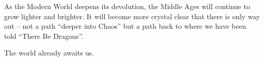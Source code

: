 As the Modern World deepens its devolution, the Middle Ages will continue to grow lighter and brighter. It will become more crystal clear that there is only way out -- not a path ``deeper into Chaos'' but a path back to where we have been told ``There Be Dragons''.

The world already awaits us.



